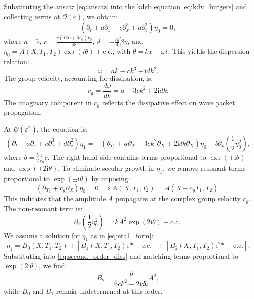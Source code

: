 \documentclass[alpha-refs, 12pt]{wiley-article}
\renewcommand{\O}{\mathcal{O}}
\newcommand{\ue}{\mathrm{e}}
\newcommand{\ui}{\mathrm{i}}
\newcommand{\eps}{\varepsilon}
\begin{document}
Substituting the ansatz \eqref{eq:ansatz} into the \acrshort{kdvb} equation \eqref{eq:kdv_burgers} and collecting terms at $\O(\eps)$, we obtain:
\begin{equation}\label{eq:leading_order_diss}
  \left( \partial_t + a \partial_x + c \partial_x^3 + d \partial_x^2 \right) \eta_0 = 0,
\end{equation}
where $a = \tilde{c}$, $c = \frac{\tilde{c} (12 \tilde{\alpha} + 3 r_0) r_0}{48}$, $d = -\frac{r_0}{4} \tilde{\beta} \gamma$, and $\eta_0 = A(X, T_1, T_2) \exp(i \theta) + \text{c.c.}$, with $\theta = k x - \omega t$. This yields the dispersion relation:
\begin{equation}\label{eq:dispersion_diss}
  \omega = a k - c k^3 + \ui d k^2.
\end{equation}
The group velocity, accounting for dissipation, is:
\begin{equation}\label{eq:group_velocity_diss}
  c_g = \frac{d \omega}{d k} = a - 3 c k^2 + 2 \ui d k.
\end{equation}
The imaginary component in $c_g$ reflects the dissipative effect on wave packet propagation.

At $\O(\eps^2)$, the equation is:
\begin{equation}\label{eq:second_order_diss}
  \left( \partial_t + a \partial_x + c \partial_x^3 + d \partial_x^2 \right) \eta_1 = - \left( \partial_{T_1} + a \partial_X - 3 c k^2 \partial_X + 2 \ui d k \partial_X \right) \eta_0 - b \partial_x \left( \frac{1}{2} \eta_0^2 \right),
\end{equation}
where $b = \frac{5}{2} \frac{1}{r_0} \tilde{c}$. The right-hand side contains terms proportional to $\exp(\pm \ui \theta)$ and $\exp(\pm 2 \ui \theta)$. To eliminate secular growth in $\eta_1$, we remove resonant terms proportional to $\exp(\pm \ui \theta)$ by imposing:
\begin{equation}\label{eq:secular_elimination_diss}
  \left( \partial_{T_1} + c_g \partial_X \right) \eta_0 = 0 \implies A(X, T_1, T_2) = A(X - c_g T_1, T_2).
\end{equation}
This indicates that the amplitude $A$ propagates at the complex group velocity $c_g$. The non-resonant term is:
\[
\partial_x \left( \frac{1}{2} \eta_0^2 \right) = \ui k A^2 \exp(2 \ui \theta) + \text{c.c.}.
\]
We assume a solution for $\eta_1$ as in \eqref{eq:eta1_form}:
\[
\eta_1 = B_0(X, T_1, T_2) + \left[ B_1(X, T_1, T_2) \ue^{\ui \theta} + \text{c.c.} \right] + \left[ B_2(X, T_1, T_2) \ue^{2 \ui \theta} + \text{c.c.} \right].
\]
Substituting into \eqref{eq:second_order_diss} and matching terms proportional to $\exp(2 \ui \theta)$, we find:
\begin{equation}
\label{eq:B2_solution_diss}
B_2 = \frac{b}{6 c k^2 - 2 \ui d k} A^2,
\end{equation}
while $B_0$ and $B_1$ remain undetermined at this order.
\end{document}
